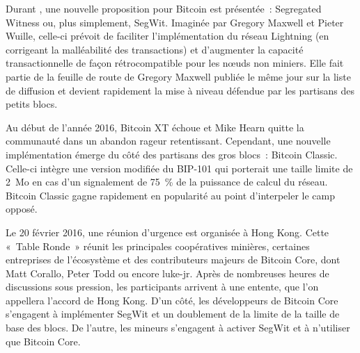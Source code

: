 Durant , une nouvelle proposition pour Bitcoin est présentée~: Segregated Witness ou, plus simplement, SegWit. Imaginée par Gregory Maxwell et Pieter Wuille, celle-ci prévoit de faciliter l'implémentation du réseau Lightning (en corrigeant la malléabilité des transactions) et d'augmenter la capacité transactionnelle de façon rétrocompatible pour les nœuds non miniers. Elle fait partie de la feuille de route de Gregory Maxwell publiée le même jour sur la liste de diffusion et devient rapidement la mise à niveau défendue par les partisans des petits blocs.

Au début de l'année 2016, Bitcoin XT échoue et Mike Hearn quitte la communauté dans un abandon rageur retentissant. Cependant, une nouvelle implémentation émerge du côté des partisans des gros blocs~: Bitcoin Classic. Celle-ci intègre une version modifiée du BIP-101 qui porterait une taille limite de 2~Mo en cas d'un signalement de 75~\% de la puissance de calcul du réseau. Bitcoin Classic gagne rapidement en popularité au point d'interpeler le camp opposé.

Le 20 février 2016, une réunion d'urgence est organisée à Hong Kong. Cette «~Table Ronde~» réunit les principales coopératives minières, certaines entreprises de l'écosystème et des contributeurs majeurs de Bitcoin Core, dont Matt Corallo, Peter Todd ou encore luke-jr. Après de nombreuses heures de discussions sous pression, les participants arrivent à une entente, que l'on appellera l'accord de Hong Kong. D'un côté, les développeurs de Bitcoin Core s'engagent à implémenter SegWit et un doublement de la limite de la taille de base des blocs. De l'autre, les mineurs s'engagent à activer SegWit et à n'utiliser que Bitcoin Core.


